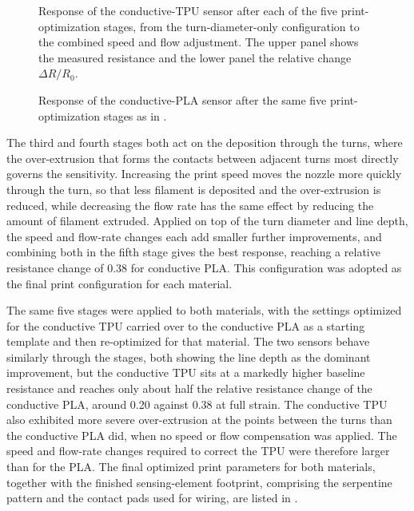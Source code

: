 \begin{figure}
\centering

    \caption{Response of the conductive-TPU sensor after each of the five print-optimization stages, from the turn-diameter-only configuration to the combined speed and flow adjustment. The upper panel shows the measured resistance and the lower panel the relative change $\Delta R/R_0$.}
    \label{fig:opt_tpu}
\end{figure}

\begin{figure}
\centering

    \caption{Response of the conductive-PLA sensor after the same five print-optimization stages as in .}
    \label{fig:opt_pla}
\end{figure}

The third and fourth stages both act on the deposition through the turns, where the over-extrusion that forms the contacts between adjacent turns most directly governs the sensitivity. Increasing the print speed moves the nozzle more quickly through the turn, so that less filament is deposited and the over-extrusion is reduced, while decreasing the flow rate has the same effect by reducing the amount of filament extruded. Applied on top of the turn diameter and line depth, the speed and flow-rate changes each add smaller further improvements, and combining both in the fifth stage gives the best response, reaching a relative resistance change of \num{0.38} for conductive PLA. This configuration was adopted as the final print configuration for each material.
 
The same five stages were applied to both materials, with the settings optimized for the conductive TPU carried over to the conductive PLA as a starting template and then re-optimized for that material. The two sensors behave similarly through the stages, both showing the line depth as the dominant improvement, but the conductive TPU sits at a markedly higher baseline resistance and reaches only about half the relative resistance change of the conductive PLA, around \num{0.20} against \num{0.38} at full strain. The conductive TPU also exhibited more severe over-extrusion at the points between the turns than the conductive PLA did, when no speed or flow compensation was applied. The speed and flow-rate changes required to correct the TPU were therefore larger than for the PLA. 
The final optimized print parameters for both materials, together with the finished sensing-element footprint, comprising the serpentine pattern and the contact pads used for wiring, are listed in .

